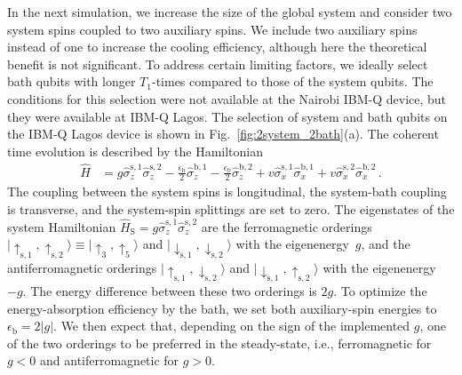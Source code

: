 \documentclass[twocolumn,amsmath,amssymb,pra]{revtex4-2}
\begin{document}
In the next simulation, we increase the size of the global system and consider two system spins coupled to two auxiliary spins.
We include two auxiliary spins instead of one to increase the cooling efficiency, although here the theoretical benefit is not significant. 
To address certain limiting factors, we ideally select bath qubits with longer $T_1$-times compared to those of the system qubits.
The conditions for this selection were not available at the Nairobi IBM-Q device, but they were available at IBM-Q Lagos.
The selection of system and bath qubits on the IBM-Q Lagos device is shown in Fig.~\ref{fig:2system_2bath}(a).
The coherent time evolution is described by the Hamiltonian
\begin{align}
\hat H &=  g\hat\sigma_z^{\textrm{s},1}\hat\sigma_z^{\textrm{s},2} -\frac{\epsilon_\textrm{b}}{2}\hat\sigma_z^{\textrm{b},1} - \frac{\epsilon_\textrm{b}}{2}\hat\sigma_z^{\textrm{b},2} + v\hat\sigma_x^{\textrm{s},1}\hat\sigma_x^{\textrm{b},1}  + v\hat\sigma_x^{\textrm{s},2}\hat\sigma_x^{\textrm{b},2} \, .
\end{align}
The coupling between the system spins is longitudinal, the system-bath coupling is transverse, and the system-spin splittings are set to zero.
The eigenstates of the system Hamiltonian $\hat H_\textrm{S}=g\hat\sigma_z^{\textrm{s},1}\hat\sigma_z^{\textrm{s},2}$
are the ferromagnetic orderings $\lvert \uparrow_{\textrm{s},1},\uparrow_{\textrm{s},2}\rangle  \equiv \lvert \uparrow_3,\uparrow_5 \rangle$ and
$\lvert \downarrow_{\textrm{s},1},\downarrow_{\textrm{s},2}\rangle$
with the eigenenergy~$g$,
and the antiferromagnetic orderings
$\lvert \uparrow_{\textrm{s},1},\downarrow_{\textrm{s},2}\rangle$ and $\lvert \downarrow_{\textrm{s},1},\uparrow_{\textrm{s},2}\rangle$
with the eigenenergy~$-g$.
The energy difference between these two orderings is $2g$.
To optimize the energy-absorption efficiency by the bath,
we set both auxiliary-spin energies to $\epsilon_\textrm{b}=2\vert g \vert$.
We then expect that, depending on the sign of the implemented $g$,
one of the two orderings to be preferred in the steady-state, i.e., ferromagnetic for $g<0$ and antiferromagnetic for $g>0$.
\end{document}
